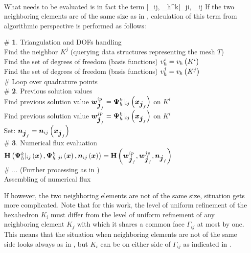 \paragraph{}
What needs to be evaluated is in fact the term
\be
\mrH{}|_{ij}\lo\bfx\ro, {\mrPsi_h^{k}}|_{ji}\lo\bfx\ro, \bfn_{ij}\lo\bfx\ro\ro
\ee
If the two neighboring elements are of the same size as in , calculation of this term from algorithmic perspective is performed as follows:\\
\begin{algorithm}[H]
\# \textbf{1}. Triangulation and DOFs handling\\
Find the neighbor $K^j$ (querying data structures representing the mesh $T$)\\
Find the set of degrees of freedom (basis functions) $v_h^i = v_h \left( K^i\right)$\\
Find the set of degrees of freedom (basis functions) $v_h^j = v_h \left( K^j\right)$\\

\# Loop over quadrature points\\
{
	\# \textbf{2}. Previous solution values\\
	Find previous solution value $\mbox{\boldmath $w$}_{\mbox{\boldmath $j$}_f}^{ip} = {\mathrm{\mathbf{\Psi}}_h^{k}}|_{ij}\left(\mbox{\boldmath $x$}_{\mbox{\boldmath $j$}_f}\right)$ on $K^i$\\
	Find previous solution value $\mbox{\boldmath $w$}_{\mbox{\boldmath $j$}_f}^{jp} = {\mathrm{\mathbf{\Psi}}_h^{k}}|_{ij}\left(\mbox{\boldmath $x$}_{\mbox{\boldmath $j$}_f}\right)$ on $K^i$\\
	Set: $\mbox{\boldmath $n$}_{\mbox{\boldmath $j$}_f} = \mbox{\boldmath $n$}_{ij}\left(\mbox{\boldmath $x$}_{\mbox{\boldmath $j$}_f}\right)$\\
	\# \textbf{3}. Numerical flux evaluation\\
	$\mathrm{\mathbf{H}}\left({\mathrm{\mathbf{\Psi}}_h^{k}}|_{ij}\left(\mbox{\boldmath $x$}\right), {\mathrm{\mathbf{\Psi}}_h^{k}}|_{ji}\left(\mbox{\boldmath $x$}\right), \mbox{\boldmath $n$}_{ij}\left(\mbox{\boldmath $x$}\right)\right)
		= \mathrm{\mathbf{H}}\left(\mbox{\boldmath $w$}_{\mbox{\boldmath $j$}_f}^{ip}, \mbox{\boldmath $w$}_{\mbox{\boldmath $j$}_f}^{jp}, \mbox{\boldmath $n$}_{\mbox{\boldmath $j$}_f}\right)$\\
		
	\# ... (Further processing as in )
}
\ \\
\caption{Assembling of numerical flux}
\label{algorithm:numFluxSimple}
\end{algorithm}

If however, the two neighboring elements are not of the same size, situation gets more complicated. Note that for this work, the level of uniform refinement of the hexahedron $K_i$ must differ from the level of uniform refinement of any neighboring element $K_j$ with which it shares a common face $\Gamma_{ij}$ at most by one. This means that the situation when neighboring elements are not of the same side looks always as in , but $K_i$ can be on either side of $\Gamma_{ij}$ as indicated in .

